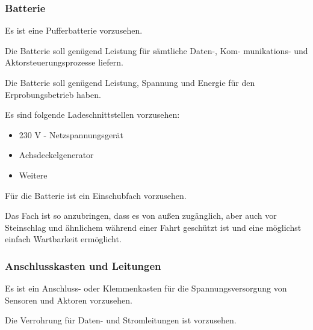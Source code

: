 \subsubsection{Batterie}
\begin{feat}
Es ist eine Pufferbatterie vorzusehen.
\end{feat}
\begin{rem}[zu Anf. 09]
Die Batterie soll genügend Leistung für sämtliche Daten-, Kom- munikations- und Aktorsteuerungsprozesse liefern.
\end{rem}
\begin{rem}[zu Anf. 09]
Die Batterie soll genügend Leistung, Spannung und Energie für den Erprobungsbetrieb haben.
\end{rem}
\begin{rem}[zu Anf. 09]
Es sind folgende Ladeschnittstellen vorzusehen:
\begin{itemize}
    \item 230 V - Netzspannungsgerät
    \item Achsdeckelgenerator
    \item Weitere
\end{itemize}
\end{rem}
\begin{feat}
Für die Batterie ist ein Einschubfach vorzusehen. 
\end{feat}
\begin{rem} [zu Anf. 10]
Das Fach ist so anzubringen, dass es von außen zugänglich, aber auch vor Steinschlag und ähnlichem während einer Fahrt geschützt ist und eine möglichst einfach Wartbarkeit ermöglicht.
\end{rem}
\subsubsection{Anschlusskasten und Leitungen}
\begin{feat}
Es ist ein Anschluss- oder Klemmenkasten für die Spannungsversorgung von Sensoren und Aktoren vorzusehen. 
\end{feat}
\begin{feat}
Die Verrohrung für Daten- und Stromleitungen ist vorzusehen.%
\end{feat}

